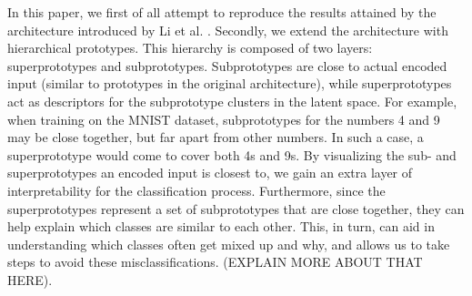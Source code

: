 In this paper, we first of all attempt to reproduce the results attained by the architecture introduced by Li et al. \citep{li2018deep}. Secondly, we extend the architecture with hierarchical prototypes. This hierarchy is composed of two layers: superprototypes and subprototypes. Subprototypes are close to actual encoded input (similar to prototypes in the original architecture), while superprototypes act as descriptors for the subprototype clusters in the latent space. For example, when training on the MNIST dataset, subprototypes for the numbers 4 and 9 may be close together, but far apart from other numbers. In such a case, a superprototype would come to cover both 4s and 9s. By visualizing the sub- and superprototypes an encoded input is closest to, we gain an extra layer of interpretability for the classification process. Furthermore, since the superprototypes represent a set of subprototypes that are close together, they can help explain which classes are similar to each other. This, in turn, can aid in understanding which classes often get mixed up and why, and allows us to take steps to avoid these misclassifications. (EXPLAIN MORE ABOUT THAT HERE). 

